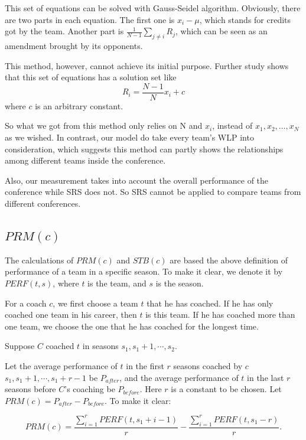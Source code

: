 This set of equations can be solved with Gauss-Seidel algorithm. Obviously, there are two parts in each equation. The first one is $x_i - \mu$, which stands for credits got by the team. Another part is  $\frac{1}{N-1}\sum_{j\neq i} R_j$, which can be seen as an amendment brought by its opponents.

This method, however, cannot achieve its initial purpose. Further study shows that this set of equations has a solution set like
$$R_i = \frac{N-1}{N}x_i + c$$
where $c$ is an arbitrary constant.

So what we got from this method only relies on N and $x_i$, instead of $x_1, x_2,\dots,x_N$ as we wished. In contrast, our model do take every team's WLP into consideration, which suggests this method can partly shows the relationships among different teams inside the conference.

Also, our measurement takes into account the overall performance of the conference while SRS does not. So SRS cannot be applied to compare teams from different conferences.

\subsection{$PRM(c)$}
The calculations of $PRM(c)$ and $STB(c)$ are based the above definition of performance of a team in a specific season. To make it clear, we denote it by $PERF(t, s)$, where $t$ is the team, and $s$ is the season. 

For a coach $c$, we first choose a team $t$ that he has coached. If he has only coached one team in his career, then $t$ is this team. If he has coached more than one team, we choose the one that he has coached for the longest time.

Suppose $C$ coached $t$ in seasons $s_1, s_1+1, \cdots, s_2$.

Let the average performance of $t$ in the first $r$ seasons coached by $c$ $s_1, s_1+1, \cdots, s_1+r-1$ be $P_{after}$, and the average performance of $t$ in the last $r$ seasons before $C$'s coaching be $P_{before}$. Here $r$ is a constant to be chosen. Let $PRM(c)=P_{after}-P_{before}$. To make it clear:
\begin{definition}
$$PRM(c)= \frac{\sum_{i = 1}^{r}PERF(t, s_1+i-1)}{r}-\frac{\sum_{i = 1}^{r}PERF(t, s_1-r)}{r}.$$
\end{definition}


